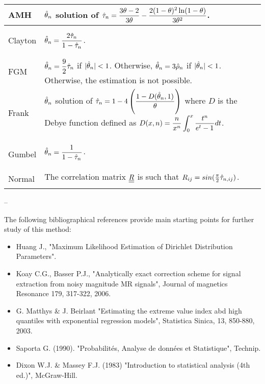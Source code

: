 {  \begin{tabular}{|l|p{12cm}|}
    \hline
    AMH & $\Hat{\theta}_n$ solution of $\displaystyle \Hat{\tau}_n = \displaystyle \frac{3\theta-2}{3\theta} - \frac{2(1-\theta)^2\ln(1-\theta)}{3\theta^2}$.\\
    \hline
    Clayton & $\displaystyle\Hat{\theta}_n=\frac{2\Hat{\tau}_n^{\strut}}{1_{\strut} - \Hat{\tau}_n}$.\\
    \hline
    FGM &  $\Hat{\theta}_n = \displaystyle \frac{9}{2}\Hat{\tau}_n^{\strut}$ if $|\Hat{\theta}_n|<1$. Otherwise,  $\Hat{\theta}_n = \displaystyle 3\Hat{\rho}_n^{\strut}$ if $|\Hat{\theta}_n|<1$. Otherwise, the estimation is not possible. \\
    \hline
    Frank & $\Hat{\theta}_n$ solution of $\displaystyle \Hat{\tau}_n = 1-4\left( \frac{1-D(\Hat{\theta}_n, 1)^{\strut}}{\theta} \right)$ where $D$ is the Debye function defined as $\displaystyle D(x, n)=\frac{n}{x^n}\int_0^x \frac{t^n}{e^t-1_{\strut}} dt$.\\
    \hline
    Gumbel & $\displaystyle \Hat{\theta}_n=\frac{1^{\strut}}{1 - \Hat{\tau}_{n_{\strut}}}$.\\
    \hline
    Normal &  The correlation matrix ${\underline{\underline{R}}}$ is such that $R_{ij} = sin(\frac{\pi}{2}\Hat{\tau}_{n,ij})_{\strut}$.\\
    \hline
  \end{tabular}

}

{
  --
}


            {
              The following bibliographical references provide main starting points for further study of  this method:
              \begin{itemize}
              \item Huang J., "Maximum Likelihood Estimation of Dirichlet Distribution Parameters".
              \item  Koay C.G., Basser P.J., "Analytically exact correction scheme
                for signal extraction from noisy magnitude MR signals", Journal of
                magnetics Resonance 179, 317-322, 2006.
              \item  G. Matthys \& J. Beirlant "Estimating the
                extreme value index abd high quantiles with exponential regression
                models", Statistica Sinica, 13, 850-880, 2003.
              \item Saporta G. (1990). "Probabilités, Analyse de données et Statistique", Technip.
              \item Dixon W.J. \& Massey F.J. (1983) "Introduction to statistical analysis (4th ed.)", McGraw-Hill.
              \end{itemize}
            }


            \Example{

              -
            }
